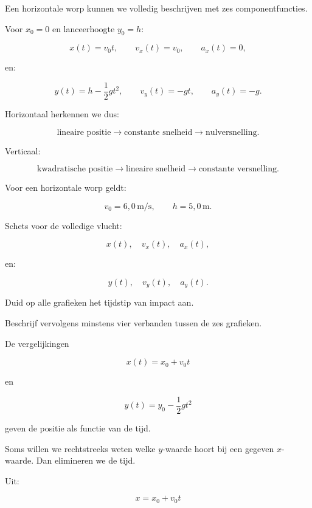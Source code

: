 \documentclass{ximera}
\begin{document}
Een horizontale worp kunnen we volledig beschrijven met zes
componentfuncties.

Voor $x_0=0$ en lanceerhoogte $y_0=h$:

\[
x(t)=v_0t,
\qquad
v_x(t)=v_0,
\qquad
a_x(t)=0,
\]

en:

\[
y(t)=h-\frac12gt^2,
\qquad
v_y(t)=-gt,
\qquad
a_y(t)=-g.
\]

Horizontaal herkennen we dus:

\[
\text{lineaire positie}
\longrightarrow
\text{constante snelheid}
\longrightarrow
\text{nulversnelling}.
\]

Verticaal:

\[
\text{kwadratische positie}
\longrightarrow
\text{lineaire snelheid}
\longrightarrow
\text{constante versnelling}.
\]


\begin{oefening}{\oefU\ESS}

Voor een horizontale worp geldt:

\[
v_0=6,0\,\mathrm{m/s},
\qquad
h=5,0\,\mathrm{m}.
\]

Schets voor de volledige vlucht:

\[
x(t),\quad v_x(t),\quad a_x(t),
\]

en:

\[
y(t),\quad v_y(t),\quad a_y(t).
\]

Duid op alle grafieken het tijdstip van impact aan.

Beschrijf vervolgens minstens vier verbanden tussen de zes grafieken.

\end{oefening}




De vergelijkingen

\[
x(t)=x_0+v_0t
\]

en

\[
y(t)=y_0-\frac12gt^2
\]

geven de positie als functie van de tijd.

Soms willen we rechtstreeks weten welke $y$-waarde hoort bij een
gegeven $x$-waarde. Dan elimineren we de tijd.

Uit:

\[
x=x_0+v_0t
\]
\end{document}
